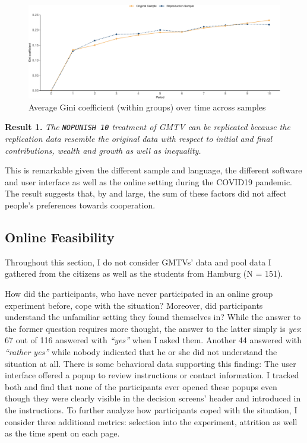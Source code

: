 \documentclass[
  authoryear,
  review,
  3p,
  onecolumn]{elsarticle}
\begin{document}
\begin{figure}

{\centering \includegraphics{paper_files/figure-pdf/fig-gini-time-series-1.pdf}

}

\caption{\label{fig-gini-time-series}Average Gini coefficient (within
groups) over time across samples}

\end{figure}

\textbf{Result 1.} \emph{The \texttt{NOPUNISH\ 10} treatment of GMTV can
be replicated because the replication data resemble the original data
with respect to initial and final contributions, wealth and growth as
well as inequality.}

This is remarkable given the different sample and language, the
different software and user interface as well as the online setting
during the COVID19 pandemic. The result suggests that, by and large, the
sum of these factors did not affect people's preferences towards
cooperation.

\hypertarget{sec-feasibility}{%
\subsection{Online Feasibility}\label{sec-feasibility}}

Throughout this section, I do not consider GMTVs' data and pool data I
gathered from the citizens as well as the students from Hamburg (N =
151).

How did the participants, who have never participated in an online group
experiment before, cope with the situation? Moreover, did participants
understand the unfamiliar setting they found themselves in? While the
answer to the former question requires more thought, the answer to the
latter simply is \emph{yes}: 67 out of 116 answered with \emph{``yes''}
when I asked them. Another 44 answered with \emph{``rather yes''} while
nobody indicated that he or she did not understand the situation at all.
There is some behavioral data supporting this finding: The user
interface offered a popup to review instructions or contact information.
I tracked both and find that none of the participants ever opened these
popups even though they were clearly visible in the decision screens'
header and introduced in the instructions. To further analyze how
participants coped with the situation, I consider three additional
metrics: selection into the experiment, attrition as well as the time
spent on each page.
\end{document}
